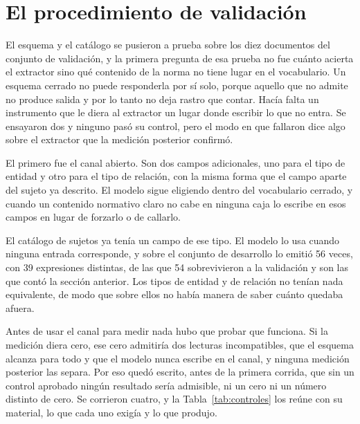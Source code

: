 \documentclass[12pt,a4paper]{report}
\begin{document}
\section{El procedimiento de validación}
\label{sec:procedimiento}

El esquema y el catálogo se pusieron a prueba sobre los diez documentos del conjunto de validación, y la primera pregunta de esa prueba no fue cuánto acierta el extractor sino qué contenido de la norma no tiene lugar en el vocabulario. Un esquema cerrado no puede responderla por sí solo, porque aquello que no admite no produce salida y por lo tanto no deja rastro que contar. Hacía falta un instrumento que le diera al extractor un lugar donde escribir lo que no entra. Se ensayaron dos y ninguno pasó su control, pero el modo en que fallaron dice algo sobre el extractor que la medición posterior confirmó.

El primero fue el canal abierto. Son dos campos adicionales, uno para el tipo de entidad y otro para el tipo de relación, con la misma forma que el campo aparte del sujeto ya descrito. El modelo sigue eligiendo dentro del vocabulario cerrado, y cuando un contenido normativo claro no cabe en ninguna caja lo escribe en esos campos en lugar de forzarlo o de callarlo.

El catálogo de sujetos ya tenía un campo de ese tipo. El modelo lo usa cuando ninguna entrada corresponde, y sobre el conjunto de desarrollo lo emitió 56 veces, con 39 expresiones distintas, de las que 54 sobrevivieron a la validación y son las que contó la sección anterior. Los tipos de entidad y de relación no tenían nada equivalente, de modo que sobre ellos no había manera de saber cuánto quedaba afuera.

Antes de usar el canal para medir nada hubo que probar que funciona. Si la medición diera cero, ese cero admitiría dos lecturas incompatibles, que el esquema alcanza para todo y que el modelo nunca escribe en el canal, y ninguna medición posterior las separa. Por eso quedó escrito, antes de la primera corrida, que sin un control aprobado ningún resultado sería admisible, ni un cero ni un número distinto de cero. Se corrieron cuatro, y la Tabla~\ref{tab:controles} los reúne con su material, lo que cada uno exigía y lo que produjo.
\end{document}
